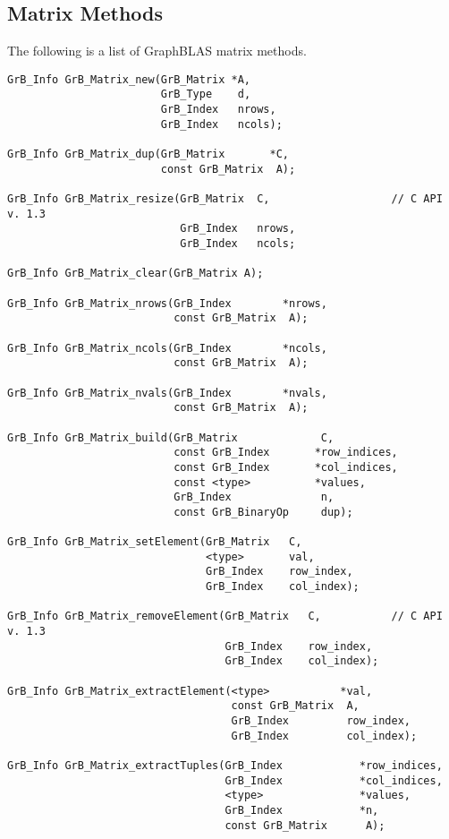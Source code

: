 \documentclass[11pt]{article}
\begin{document}
\subsection{Matrix Methods}

The following is a list of GraphBLAS matrix methods.

\begin{verbatim}
GrB_Info GrB_Matrix_new(GrB_Matrix *A,
                        GrB_Type    d,
                        GrB_Index   nrows,
                        GrB_Index   ncols);

GrB_Info GrB_Matrix_dup(GrB_Matrix       *C,
                        const GrB_Matrix  A);

GrB_Info GrB_Matrix_resize(GrB_Matrix  C,                   // C API v. 1.3
                           GrB_Index   nrows,
                           GrB_Index   ncols;

GrB_Info GrB_Matrix_clear(GrB_Matrix A);

GrB_Info GrB_Matrix_nrows(GrB_Index        *nrows,
                          const GrB_Matrix  A);

GrB_Info GrB_Matrix_ncols(GrB_Index        *ncols,
                          const GrB_Matrix  A);

GrB_Info GrB_Matrix_nvals(GrB_Index        *nvals,
                          const GrB_Matrix  A);

GrB_Info GrB_Matrix_build(GrB_Matrix             C,
                          const GrB_Index       *row_indices,
                          const GrB_Index       *col_indices, 
                          const <type>          *values,
                          GrB_Index              n,
                          const GrB_BinaryOp     dup);

GrB_Info GrB_Matrix_setElement(GrB_Matrix   C,
                               <type>       val,
                               GrB_Index    row_index,
                               GrB_Index    col_index);

GrB_Info GrB_Matrix_removeElement(GrB_Matrix   C,           // C API v. 1.3
                                  GrB_Index    row_index,
                                  GrB_Index    col_index);

GrB_Info GrB_Matrix_extractElement(<type>           *val,
                                   const GrB_Matrix  A,
                                   GrB_Index         row_index,
                                   GrB_Index         col_index);

GrB_Info GrB_Matrix_extractTuples(GrB_Index            *row_indices,
                                  GrB_Index            *col_indices,
                                  <type>               *values, 
                                  GrB_Index            *n, 
                                  const GrB_Matrix      A);
\end{verbatim}
                       
\end{document}
